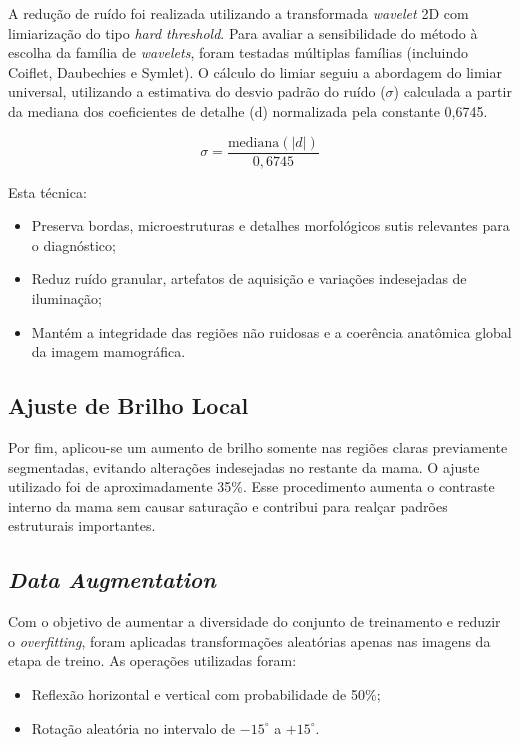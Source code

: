 A redução de ruído foi realizada utilizando a transformada \textit{wavelet} 2D com limiarização do tipo \textit{hard threshold}. Para avaliar a sensibilidade do método à escolha da família de \textit{wavelets}, foram testadas múltiplas famílias (incluindo Coiflet, Daubechies e Symlet). O cálculo do limiar seguiu a abordagem do limiar universal, utilizando a estimativa do desvio padrão do ruído ($\sigma$) calculada a partir da mediana dos coeficientes de detalhe (d) normalizada pela constante 0,6745.

\begin{equation}
\sigma = \frac{\text{mediana}(|d|)}{0,6745}
\end{equation}

Esta técnica:

\begin{itemize}
    \item Preserva bordas, microestruturas e detalhes morfológicos sutis relevantes para o diagnóstico;
    \item Reduz ruído granular, artefatos de aquisição e variações indesejadas de iluminação;
    \item Mantém a integridade das regiões não ruidosas e a coerência anatômica global da imagem mamográfica.
\end{itemize}

\subsection*{Ajuste de Brilho Local}

Por fim, aplicou-se um aumento de brilho somente nas regiões claras previamente segmentadas, evitando alterações indesejadas no restante da mama. O ajuste utilizado foi de aproximadamente 35\%. Esse procedimento aumenta o contraste interno da mama sem causar saturação e contribui para realçar padrões estruturais importantes.

\subsection{\textit{Data Augmentation}}\label{subsec:data_augmentation}

Com o objetivo de aumentar a diversidade do conjunto de treinamento e reduzir o \textit{overfitting}, foram aplicadas transformações aleatórias apenas nas imagens da etapa de treino. As operações utilizadas foram:
\begin{itemize}
    \item Reflexão horizontal e vertical com probabilidade de 50\%;
    \item Rotação aleatória no intervalo de $-15^\circ$ a $+15^\circ$.
\end{itemize}

